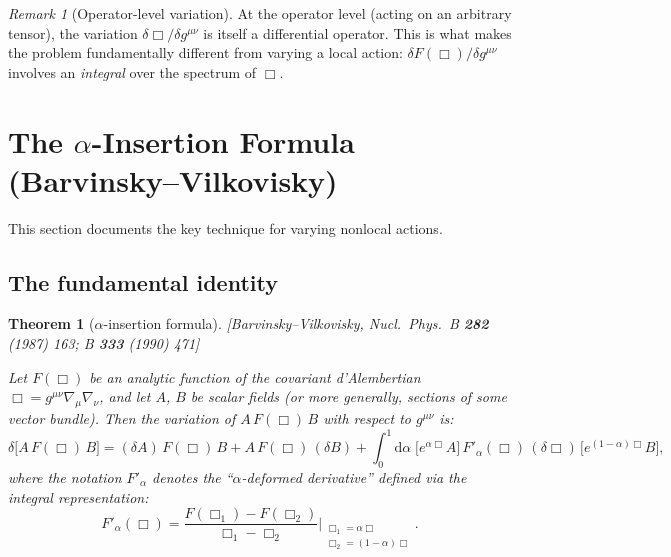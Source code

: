 \documentclass[12pt,a4paper]{article}
\newtheorem{theorem}[proposition]{Theorem}
\theoremstyle{definition}
\theoremstyle{remark}
\newtheorem{remark}[proposition]{Remark}
\newcommand{\dd}{\mathrm{d}}
\newcommand{\fromlit}[1]{\textcolor{blue!70!black}{\textsf{[#1]}}}
\begin{document}
\begin{remark}[Operator-level variation]
\label{rem:op-level}
At the operator level (acting on an arbitrary tensor), the variation
$\delta\Box/\delta g^{\mu\nu}$ is itself a differential operator.
This is what makes the problem fundamentally different from varying
a local action: $\delta F(\Box)/\delta g^{\mu\nu}$ involves an
\emph{integral} over the spectrum of $\Box$.
\end{remark}


\section{The $\alpha$-Insertion Formula (Barvinsky--Vilkovisky)}
\label{sec:alpha-insertion}

This section documents the key technique for varying nonlocal actions.

\subsection{The fundamental identity}

\begin{theorem}[$\alpha$-insertion formula]
\label{thm:alpha-insertion}
\fromlit{Barvinsky--Vilkovisky, Nucl.\ Phys.\ B \textbf{282} (1987)
163; B \textbf{333} (1990) 471}

Let $F(\Box)$ be an analytic function of the covariant d'Alembertian
$\Box = g^{\mu\nu}\nabla_\mu\nabla_\nu$, and let $A$, $B$ be scalar
fields (or more generally, sections of some vector bundle).  Then the
variation of $A\,F(\Box)\,B$ with respect to $g^{\mu\nu}$ is:
\begin{equation}\label{eq:alpha-insertion}
  \boxed{
  \delta\big[A\,F(\Box)\,B\big]
  = (\delta A)\,F(\Box)\,B
  + A\,F(\Box)\,(\delta B)
  + \int_0^1\!\dd\alpha\;
    \big[e^{\alpha\Box}A\big]\,
    F'_\alpha(\Box)\,(\delta\Box)\,
    \big[e^{(1-\alpha)\Box}B\big],
  }
\end{equation}
where the notation $F'_\alpha$ denotes the ``$\alpha$-deformed
derivative'' defined via the integral representation:
\begin{equation}\label{eq:F-alpha-def}
  F'_\alpha(\Box) = \frac{F(\Box_1) - F(\Box_2)}{\Box_1 - \Box_2}
  \bigg|_{\substack{\Box_1 = \alpha\Box \\ \Box_2 = (1-\alpha)\Box}}.
\end{equation}
\end{theorem}
\end{document}
